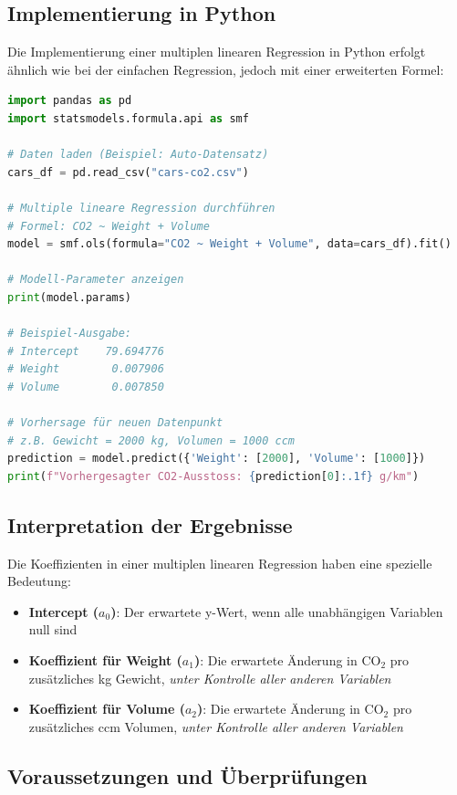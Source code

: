 \subsection{Implementierung in Python}

Die Implementierung einer multiplen linearen Regression in Python erfolgt ähnlich wie bei der einfachen Regression, jedoch mit einer erweiterten Formel:

\begin{lstlisting}[language=Python]
import pandas as pd
import statsmodels.formula.api as smf

# Daten laden (Beispiel: Auto-Datensatz)
cars_df = pd.read_csv("cars-co2.csv")

# Multiple lineare Regression durchführen
# Formel: CO2 ~ Weight + Volume
model = smf.ols(formula="CO2 ~ Weight + Volume", data=cars_df).fit()

# Modell-Parameter anzeigen
print(model.params)

# Beispiel-Ausgabe:
# Intercept    79.694776
# Weight        0.007906
# Volume        0.007850

# Vorhersage für neuen Datenpunkt
# z.B. Gewicht = 2000 kg, Volumen = 1000 ccm
prediction = model.predict({'Weight': [2000], 'Volume': [1000]})
print(f"Vorhergesagter CO2-Ausstoss: {prediction[0]:.1f} g/km")
\end{lstlisting}

\subsection{Interpretation der Ergebnisse}

Die Koeffizienten in einer multiplen linearen Regression haben eine spezielle Bedeutung:

\begin{itemize}
	\item \textbf{Intercept ($a_0$)}: Der erwartete y-Wert, wenn alle unabhängigen Variablen null sind
	\item \textbf{Koeffizient für Weight ($a_1$)}: Die erwartete Änderung in CO$_2$ pro zusätzliches kg Gewicht, \textit{unter Kontrolle aller anderen Variablen}
	\item \textbf{Koeffizient für Volume ($a_2$)}: Die erwartete Änderung in CO$_2$ pro zusätzliches ccm Volumen, \textit{unter Kontrolle aller anderen Variablen}
\end{itemize}

\subsection{Voraussetzungen und Überprüfungen}

